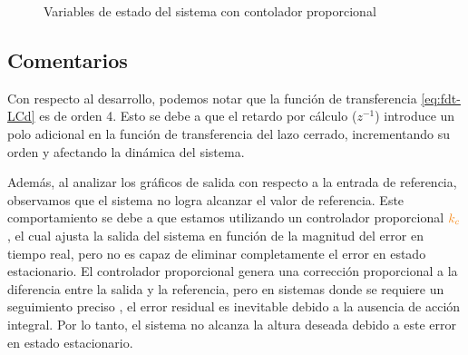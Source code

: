 \begin{figure}[h]
  \centering
  
  \caption{Variables de estado del sistema con contolador proporcional}\label{fig:estado-prop-disc-marge}
\end{figure}

\FloatBarrier

\subsection{Comentarios}

Con respecto al desarrollo, podemos notar que la función de transferencia
\eqref{eq:fdt-LCd} es de orden 4. Esto se debe a que el retardo por cálculo
($z^{-1}$) introduce un polo adicional en la función de transferencia del lazo
cerrado, incrementando su orden y afectando la dinámica del sistema.

Además, al analizar los gráficos de salida con respecto a la entrada de referencia,
observamos que el sistema no logra alcanzar el valor de referencia. Este
comportamiento se debe a que estamos utilizando un controlador proporcional
$\nara{k_c}$, el cual ajusta la salida del sistema en función de la magnitud del
error en tiempo real, pero no es capaz de eliminar completamente el error en estado
estacionario. El controlador proporcional genera una corrección proporcional a la
diferencia entre la salida y la referencia, pero en sistemas donde se requiere un
seguimiento preciso , el error residual es inevitable debido a la ausencia de
acción integral. Por lo tanto, el sistema no alcanza la altura deseada debido a
este error en estado estacionario.

